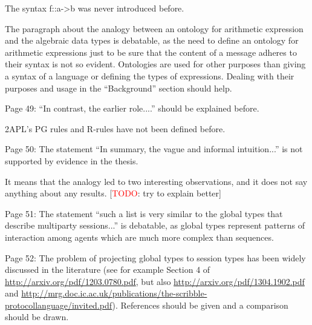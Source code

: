 \documentclass{article}
\newcommand{\todo}[1]{[\textcolor{red}{TODO}: #1]}
\newenvironment{them}{\noindent\begingroup\color{blue}}{\endgroup\par}
\begin{document}
\begin{them}

The syntax f::a->b was never introduced before.
\end{them}
\todo{?}

\begin{them}

The paragraph about the analogy between an ontology for arithmetic expression
and the algebraic data types is debatable, as the need to define an ontology
for arithmetic expressions just to be sure that the content of a message
adheres to their syntax is not so evident. Ontologies are used for other
purposes than giving a syntax of a language or defining the types of
expressions. Dealing with their purposes and usage in the “Background” section
should help.

\end{them}
\todo{?}

\begin{them}

Page 49:
“In contrast, the earlier role....” should be explained before.
\end{them}
\todo{?}

\begin{them}

2APL's PG rules and R-rules have not been defined before.
\end{them}
\todo{define 2APL's rules}

\begin{them}

Page 50:
The statement “In summary, the vague and informal intuition...” is not
supported by evidence in the thesis.

\end{them}
It means that the analogy led to two interesting observations, and it does not
say anything about any results.
\todo{try to explain better}

\begin{them}

Page 51:
The statement “such a list is very similar to the global types that describe
multiparty sessions...” is debatable, as global types represent patterns of
interaction among agents which are much more complex than sequences.

\end{them}
\todo{?}

\begin{them}

Page 52:
The problem of projecting global types to session types has been widely
discussed in the literature (see for example Section 4 of
\url{http://arxiv.org/pdf/1203.0780.pdf}, but also
\url{http://arxiv.org/pdf/1304.1902.pdf} and
\url{http://mrg.doc.ic.ac.uk/publications/the-scribble-protocollanguage/invited.pdf}).
References should be given and a comparison should be drawn.

\end{them}
\todo{?}
\end{document}
